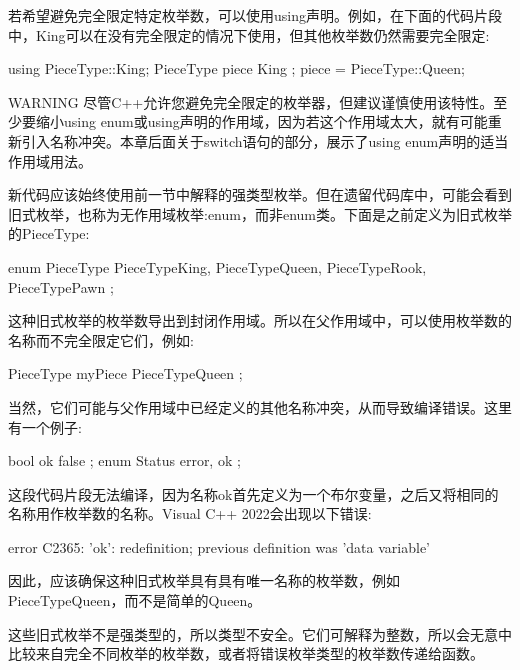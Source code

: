 若希望避免完全限定特定枚举数，可以使用using声明。例如，在下面的代码片段中，King可以在没有完全限定的情况下使用，但其他枚举数仍然需要完全限定:

\begin{cpp}
using PieceType::King;
PieceType piece { King };
piece = PieceType::Queen;
\end{cpp}

\begin{myWarning}{WARNING}
尽管C++允许您避免完全限定的枚举器，但建议谨慎使用该特性。至少要缩小using enum或using声明的作用域，因为若这个作用域太大，就有可能重新引入名称冲突。本章后面关于switch语句的部分，展示了using enum声明的适当作用域用法。
\end{myWarning}


新代码应该始终使用前一节中解释的强类型枚举。但在遗留代码库中，可能会看到旧式枚举，也称为无作用域枚举:enum，而非enum类。下面是之前定义为旧式枚举的PieceType:

\begin{cpp}
enum PieceType { PieceTypeKing, PieceTypeQueen, PieceTypeRook, PieceTypePawn };
\end{cpp}

这种旧式枚举的枚举数导出到封闭作用域。所以在父作用域中，可以使用枚举数的名称而不完全限定它们，例如:

\begin{cpp}
PieceType myPiece { PieceTypeQueen };
\end{cpp}

当然，它们可能与父作用域中已经定义的其他名称冲突，从而导致编译错误。这里有一个例子:

\begin{cpp}
bool ok { false };
enum Status { error, ok };
\end{cpp}

这段代码片段无法编译，因为名称ok首先定义为一个布尔变量，之后又将相同的名称用作枚举数的名称。Visual C++ 2022会出现以下错误:

\begin{shell}
error C2365: 'ok': redefinition; previous definition was 'data variable'
\end{shell}

因此，应该确保这种旧式枚举具有具有唯一名称的枚举数，例如PieceTypeQueen，而不是简单的Queen。

这些旧式枚举不是强类型的，所以类型不安全。它们可解释为整数，所以会无意中比较来自完全不同枚举的枚举数，或者将错误枚举类型的枚举数传递给函数。


